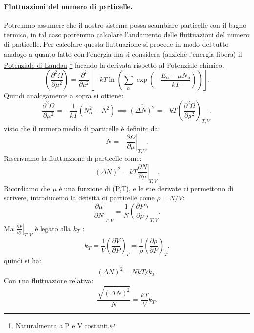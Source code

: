 \paragraph{Fluttuazioni del numero di particelle.}%
Potremmo assumere che il nostro sistema possa scambiare particelle con il bagno termico, in tal caso potremmo calcolare l'andamento delle fluttuazioni del numero di particelle. 
Per calcolare questa fluttuazione si procede in modo del tutto analogo a quanto fatto con l'energia ma si considera (anzichè l'energia libera) il \hyperref[eq:potenziale-Landau1]{Potenziale di Landau} \footnote{Naturalmenta a P e V costanti.} facendo la derivata rispetto al Potenziale chimico.
\[
	\left( \frac{\partial ^2 \Omega}{\partial \mu^2}  \right)  = \frac{\partial ^2}{\partial \mu^2} \left[ -kT \ln \left( \sum_{\alpha}^{} \exp\left( -\frac{E_{\alpha}-\mu N_{\alpha}}{kT} \right)  \right)  \right] 
.\] 
Quindi analogamente a sopra si ottiene:
\[
	\frac{\partial ^2\Omega}{\partial \mu^2} = -\frac{1}{kT}\left( \overline{N_{\alpha}^2}- N^2 \right) \implies
	\overline{\left( \Delta N \right) ^2} = - kT \left( \frac{\partial ^2\Omega}{\partial \mu^2}  \right) _{T,V} \label{eq:flut-num-particelle}
.\] 
visto che il numero medio di particelle è definito da:
\[
	N = -\left.\frac{\partial \Omega}{\partial\mu} \right|_{T,V}
.\] 
Riscriviamo la fluttuazione di particelle come:
\[
	\overline{\left( \Delta N \right) ^2} = kT \left.\frac{\partial N}{\partial \mu} \right|_{T,V}
.\] 
Ricordiamo che $\mu$ è una funzione di (P,T), e le sue derivate ci permettono di scrivere, introducento la densità di particelle come $\rho = N /V$: 
\[
	\left.\frac{\partial \mu}{\partial N} \right|_{T,V} = \frac{1}{N}\left( \frac{\partial P}{\partial \rho}  \right) _{T,V}
.\] 
Ma $\left.\frac{\partial P}{\partial \rho} \right|_{T,V}$ è legato alla $k_{T}$ :
\[
	k_{T} = \frac{1}{V}\left( \frac{\partial V}{\partial P}  \right) _{T} = \frac{1}{\rho}\left( \frac{\partial \rho}{\partial P}  \right) _{T}
.\] 
quindi si ha:
\[
	\overline{\left( \Delta N \right) ^2}= NkT \rho k_{T}
.\]
Con una fluttuazione relativa:
\[
	\frac{\sqrt{\overline{\left( \Delta N \right) ^2}} }{N} = \frac{kT}{V}k_{T}
.\] 
